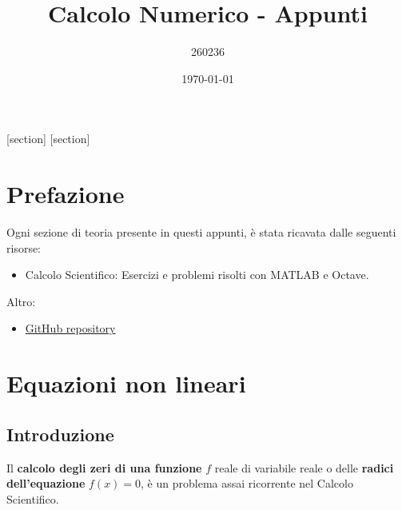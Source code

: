 \documentclass[a4paper]{article}
\begin{document}
    [section]
    [section]
    
    

    \author{260236}
	\title{Calcolo Numerico - Appunti}
	\date{\printdayoff\today}
	\maketitle

	\newpage

    \section*{Prefazione}

    Ogni sezione di teoria presente in questi appunti, è stata ricavata dalle seguenti risorse:
    \begin{itemize}
        \item Calcolo Scientifico: Esercizi e problemi risolti con MATLAB e Octave.\cite{quarteroni2017calcolo}
    \end{itemize}
    Altro:
    \begin{itemize}
        \item[\faIcon{github}] \href{https://github.com/PoliMI-HPC-E-notes-projects-AndreVale69/HPC-E-PoliMI-university-notes}{GitHub repository}
    \end{itemize}
    
    \newpage
	
	\tableofcontents

    \newpage

    \section{Equazioni non lineari}

    \subsection{Introduzione}

    Il \textbf{calcolo degli zeri di una funzione} $f$ reale di variabile reale o delle \textbf{radici dell'equazione} $f\left(x\right)=0$, è un problema assai ricorrente nel Calcolo Scientifico.
\end{document}
